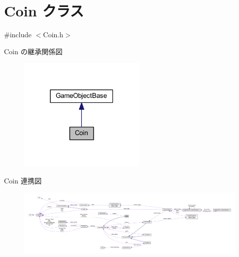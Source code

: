 \hypertarget{class_coin}{}\section{Coin クラス}
\label{class_coin}


{\ttfamily \#include $<$Coin.\+h$>$}



Coin の継承関係図\nopagebreak
\begin{figure}[H]
\begin{center}
\leavevmode
\includegraphics[width=174pt]{class_coin__inherit__graph}
\end{center}
\end{figure}


Coin 連携図\nopagebreak
\begin{figure}[H]
\begin{center}
\leavevmode
\includegraphics[width=350pt]{class_coin__coll__graph}
\end{center}
\end{figure}
